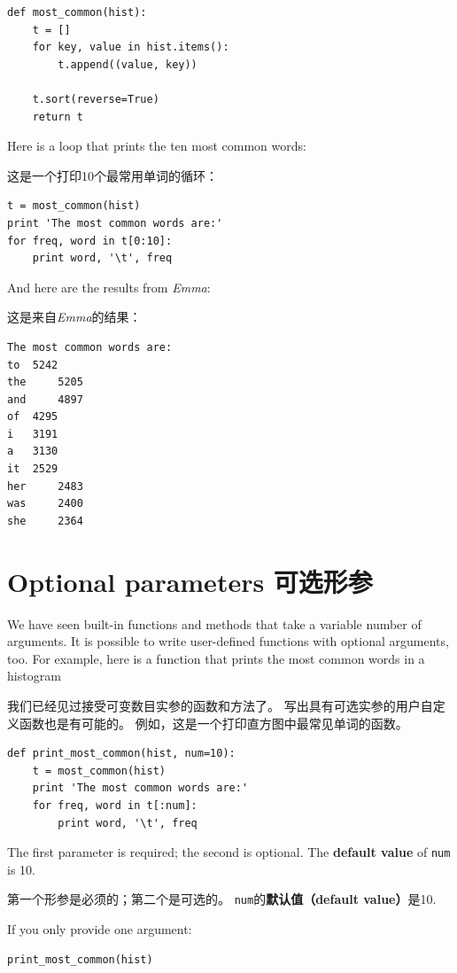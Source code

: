 \documentclass[10pt]{book}
\begin{document}
\begin{CJK}{UTF8}{gbsn}
\begin{verbatim}
def most_common(hist):
    t = []
    for key, value in hist.items():
        t.append((value, key))

    t.sort(reverse=True)
    return t
\end{verbatim}
%
Here is a loop that prints the ten most common words:

这是一个打印10个最常用单词的循环：

\begin{verbatim}
t = most_common(hist)
print 'The most common words are:'
for freq, word in t[0:10]:
    print word, '\t', freq
\end{verbatim}
%
And here are the results from {\em Emma}:

这是来自{\em Emma}的结果：

\begin{verbatim}
The most common words are:
to 	5242
the 	5205
and 	4897
of 	4295
i 	3191
a 	3130
it 	2529
her 	2483
was 	2400
she 	2364
\end{verbatim}
%

\section{Optional parameters 可选形参}

We have seen built-in functions and methods that take a variable
number of arguments.  It is possible to write user-defined functions
with optional arguments, too.  For example, here is a function that
prints the most common words in a histogram

我们已经见过接受可变数目实参的函数和方法了。
写出具有可选实参的用户自定义函数也是有可能的。
例如，这是一个打印直方图中最常见单词的函数。

\begin{verbatim}
def print_most_common(hist, num=10):
    t = most_common(hist)
    print 'The most common words are:'
    for freq, word in t[:num]:
        print word, '\t', freq
\end{verbatim}

The first parameter is required; the second is optional.
The {\bf default value} of {\tt num} is 10.

第一个形参是必须的；第二个是可选的。
{\tt num}的{\bf 默认值（default value）}是10.

If you only provide one argument:

\begin{verbatim}
print_most_common(hist)
\end{verbatim}


\end{CJK}
\end{document}
